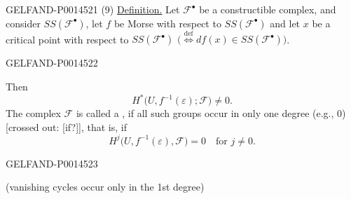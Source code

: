 \begin{GelfandAdjacentEvidence}{GELFAND-P001452}{1}
(9) \uline{Definition.}
Let \(\mathcal{F}^{\bullet}\) be a constructible complex, and consider
\(SS(\mathcal{F}^{\bullet})\), let \(f\) be Morse with respect to
\(SS(\mathcal{F}^{\bullet})\) and let \(x\)
be a critical point with respect to \(SS(\mathcal{F}^{\bullet})\)
\(\bigl(\overset{\mathrm{def}}{\Longleftrightarrow}
df(x)\in SS(\mathcal{F}^{\bullet})\bigr)\).
\end{GelfandAdjacentEvidence}
\begin{GelfandAdjacentEvidence}{GELFAND-P001452}{2}

Then
\[
H^{*}\bigl(U,f^{-1}(\varepsilon);\mathcal{F}\bigr)\ne0.
\]
The complex \(\mathcal{F}\) is called a ,
if all such groups occur in only one degree
(e.g., \(0\)) [crossed out: [if?]], that is, if
\begin{equation*}
H^{j}\bigl(U,f^{-1}(\varepsilon),\mathcal{F}\bigr)=0
\quad\text{for }j\ne0. \tag{10}
\end{equation*}
\end{GelfandAdjacentEvidence}
\begin{GelfandAdjacentEvidence}{GELFAND-P001452}{3}

(vanishing cycles occur only in the 1st degree)
\end{GelfandAdjacentEvidence}

